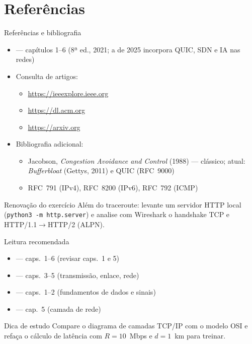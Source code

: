 \documentclass[aspectratio=169,11pt]{beamer}
\begin{document}
\section{Referências}

\begin{frame}{Referências e bibliografia}
  \begin{itemize}
    \item \textbf{\kurose} --- capítulos 1--6 (8ª ed., 2021; a de 2025 incorpora QUIC, SDN e IA nas redes)
    \item Consulta de artigos:
      \begin{itemize}
        \item \url{https://ieeexplore.ieee.org}
        \item \url{https://dl.acm.org}
        \item \url{https://arxiv.org}
      \end{itemize}
    \item Bibliografia adicional:
      \begin{itemize}
        \item Jacobson, \emph{Congestion Avoidance and Control} (1988) --- clássico; atual: \emph{Bufferbloat} (Gettys, 2011) e QUIC (RFC~9000)
        \item RFC~791 (IPv4), RFC~8200 (IPv6), RFC~792 (ICMP)
      \end{itemize}
  \end{itemize}
  \begin{exampleblock}{Renovação do exercício}
    Além do traceroute: levante um servidor HTTP local (\texttt{python3 -m http.server}) e analise com Wireshark o handshake TCP e HTTP/1.1$\rightarrow$HTTP/2 (ALPN).
  \end{exampleblock}
\end{frame}

\begin{frame}{Leitura recomendada}
  \begin{itemize}
    \item \textbf{\kurose{}} --- caps.~1--6 (revisar caps.~1 e 5)
    \item \textbf{\forouzan{}} --- caps.~3--5 (transmissão, enlace, rede)
    \item \textbf{\stallings{}} --- caps.~1--2 (fundamentos de dados e sinais)
    \item \textbf{\tanenbaum{}} --- cap.~5 (camada de rede)
  \end{itemize}
  \begin{exampleblock}{Dica de estudo}
    Compare o diagrama de camadas TCP/IP com o modelo OSI e refaça o cálculo de latência com $R = 10$~Mbps e $d = 1$~km para treinar.
  \end{exampleblock}
\end{frame}
\end{document}
